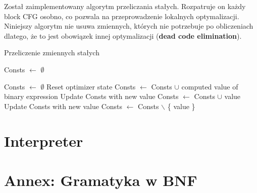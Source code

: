 \documentclass[leqno, 12pt]{article}
\newcommand{\spacing}{\vskip 0.5cm}
\begin{document}
			Został zaimplementowany algorytm przeliczania stałych. Rozpatruje on każdy block CFG osobno,
			co pozwala na przeprowadzenie lokalnych optymalizacji. Niniejszy algorytm nie usuwa zmiennych,
			których nie potrzebuje po obliczeniach dlatego, że to jest obowiązek innej optymalizacji
			(\textbf{dead code elimination}). 

			\spacing
		
			\begin{algorithm}
				\caption{Przeliczenie zmiennych stałych}
				\begin{algorithmic}[1]

					\State Consts $\gets$ $\emptyset$
					
							\State Consts $\gets$ $\emptyset$
							\Comment Reset optimizer state
						\EndIf
							\State Consts $\gets$ Consts $\cup$ computed value of binary expression
						\EndIf
									\State Update Consts with new value
								\Else
									\State Consts $\gets$ Consts $\cup$ value
								\EndIf
							\EndIf
									\State Update Consts with new value
								\Else
									\State Consts $\gets$ Consts $\backslash$ \{ value \}
								\EndIf
							\EndIf
						\EndIf
					\EndFor
				\EndProcedure

				\end{algorithmic}
			\end{algorithm}
		
		\newpage

	\section{Interpreter}
		
		
		
		\newpage
	
	\section{Annex: Gramatyka w BNF}

        \setlength{\grammarindent}{12em}
\end{document}
